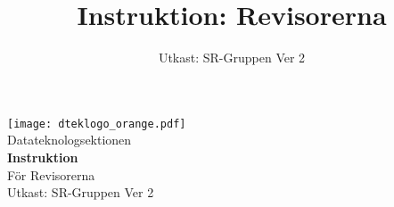 \documentclass[a4paper]{dtek}
\title{Instruktion: Revisorerna}
\date{Utkast: SR-Gruppen Ver 2}
\begin{document}
\begin{titlepage}
  \thispagestyle{empty} %
  \vspace*{\fill}
  \begin{center}
    \texttt{[image: dteklogo\_orange.pdf]}\\[3em]
    {\Huge Datateknologsektionen}\\[3em]
    {\Huge \textbf{Instruktion}}\\[1em]
    {\Huge För Revisorerna}\\[3em]
    Utkast: SR-Gruppen Ver 2\\[20em]
  \end{center}
  \vspace*{\fill}
\end{titlepage}

\makeheadfoot

\setcounter{tocdepth}{2}
\tableofcontents
\end{document}
